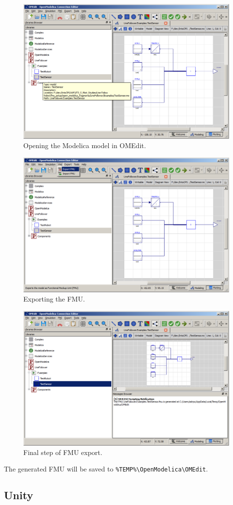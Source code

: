 %
%
%
\begin{figure}[ht]
	\centerline{\includegraphics[width=12.5cm]{figures/OMEdit_3.png}}
	\caption{Opening the Modelica model in OMEdit.}
	\label{figure:OMEdit_3}
\end{figure}
%
%
%
\begin{figure}[ht]
	\centerline{\includegraphics[width=12.5cm]{figures/OMEdit_4.png}}
	\caption{Exporting the FMU.}
	\label{figure:OMEdit_4}
\end{figure}
%
%
%
\begin{figure}[ht]
	\centerline{\includegraphics[width=12.5cm]{figures/OMEdit_5.png}}
	\caption{Final step of FMU export.}
	\label{figure:OMEdit_5}
\end{figure}
%
%
%
The generated FMU will be saved to \texttt{\%{}TEMP\%{}\textbackslash{}OpenModelica\textbackslash{}OMEdit}.
\clearpage
\subsection{Unity}\label{sec:simulators:unity}

\clearpage